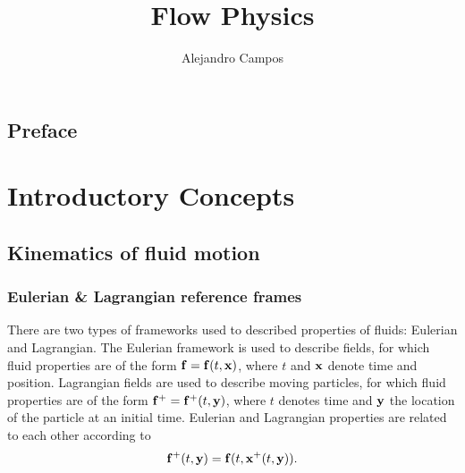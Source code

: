 \documentclass[oneside,a4paper,11pt]{report}
\title{Flow Physics}
\author{Alejandro Campos}
\begin{document}
\maketitle
\tableofcontents

\chapter*{Preface}

\part{Introductory Concepts}                                                  %

%
\chapter{Kinematics of fluid motion}
%

\section{Eulerian \& Lagrangian reference frames}
There are two types of frameworks used to described properties of fluids: Eulerian and Lagrangian. The Eulerian framework is used to describe fields, for which fluid properties are of the form $\mathbf{f} = \mathbf{f}(t,\mathbf{x})$, where $t$ and $\mathbf{x}$ denote time and position. Lagrangian fields are used to describe moving particles, for which fluid properties are of the form $\mathbf{f}^+ = \mathbf{f}^+(t,\mathbf{y})$, where $t$ denotes time and $\mathbf{y}$ the location of the particle at an initial time. Eulerian and Lagrangian properties are related to each other according to 
\begin{equation}
\mathbf{f}^+(t,\mathbf{y})=\mathbf{f}(t,\mathbf{x}^+(t,\mathbf{y})).
\end{equation}
\end{document}
